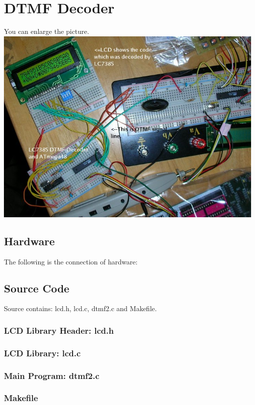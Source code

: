 \documentclass[11pt,a4paper]{article}
\begin{document}
\section{DTMF Decoder}
\begin{center}
You can enlarge the picture.\\
\includegraphics[scale=0.8]{../dtmf-decoder/dtmf-de.jpg}
\end{center}

\subsection{Hardware}
The following is the connection of hardware:


\subsection{Source Code}
Source contains: lcd.h, lcd.c, dtmf2.c and Makefile.\\
\subsubsection{LCD Library Header: lcd.h}


\subsubsection{LCD Library: lcd.c}


\subsubsection{Main Program: dtmf2.c}


\subsubsection{Makefile}

\end{document}

